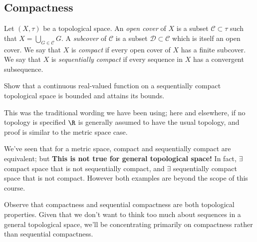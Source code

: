 \subsection{Compactness}
\vspace{3mm}
\begin{definition}
Let $(X,\tau)$ be a topological space. An \emph{open cover} of $X$ is a subset $\mathcal{C}\subset \tau$ such that $X = \bigcup_{G\in\mathcal{C}} G$. A \emph{subcover} of $\mathcal{C}$ is a subset $\mathcal{D}\subset \mathcal{C}$ which is itself an open cover. We say that $X$ is \emph{compact} if every open cover of $X$ has a finite subcover. We say that $X$ is \emph{sequentially compact} if every sequence in $X$ has a convergent subsequence.
\end{definition}
\begin{exercise}
Show that a continuous real-valued function on a sequentially compact topological space is bounded and attains its bounds.
\end{exercise}
\begin{remark}
This was the traditional wording we have been using; here and elsewhere, if no topology is specified $\R$ is generally assumed to have the usual topology, and proof is similar to the metric space case.

We've seen that for a metric space, compact and sequentially compact are equivalent; but \textbf{\color{red} This is not true for general topological space!} In fact, $\exists$ compact space that is not sequentially compact, and $\exists$ sequentially compact space that is not compact. However both examples are beyond the scope of this course.

Observe that compactness and sequential compactness are both topological properties. Given that we don't want to think too much about sequences in a general topological space, we'll be concentrating primarily on compactness rather than sequential compactness.
\end{remark}